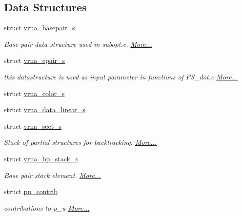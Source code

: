 \subsection*{Data Structures}
\begin{DoxyCompactItemize}
\item 
struct \mbox{\hyperlink{group__data__structures_structvrna__basepair__s}{vrna\+\_\+basepair\+\_\+s}}
\begin{DoxyCompactList}\small\item\em Base pair data structure used in subopt.\+c.  \mbox{\hyperlink{group__data__structures_structvrna__basepair__s}{More...}}\end{DoxyCompactList}\item 
struct \mbox{\hyperlink{group__data__structures_structvrna__cpair__s}{vrna\+\_\+cpair\+\_\+s}}
\begin{DoxyCompactList}\small\item\em this datastructure is used as input parameter in functions of P\+S\+\_\+dot.\+c  \mbox{\hyperlink{group__data__structures_structvrna__cpair__s}{More...}}\end{DoxyCompactList}\item 
struct \mbox{\hyperlink{group__data__structures_structvrna__color__s}{vrna\+\_\+color\+\_\+s}}
\item 
struct \mbox{\hyperlink{group__data__structures_structvrna__data__linear__s}{vrna\+\_\+data\+\_\+linear\+\_\+s}}
\item 
struct \mbox{\hyperlink{group__data__structures_structvrna__sect__s}{vrna\+\_\+sect\+\_\+s}}
\begin{DoxyCompactList}\small\item\em Stack of partial structures for backtracking.  \mbox{\hyperlink{group__data__structures_structvrna__sect__s}{More...}}\end{DoxyCompactList}\item 
struct \mbox{\hyperlink{group__data__structures_structvrna__bp__stack__s}{vrna\+\_\+bp\+\_\+stack\+\_\+s}}
\begin{DoxyCompactList}\small\item\em Base pair stack element.  \mbox{\hyperlink{group__data__structures_structvrna__bp__stack__s}{More...}}\end{DoxyCompactList}\item 
struct \mbox{\hyperlink{group__data__structures_structpu__contrib}{pu\+\_\+contrib}}
\begin{DoxyCompactList}\small\item\em contributions to p\+\_\+u  \mbox{\hyperlink{group__data__structures_structpu__contrib}{More...}}\end{DoxyCompactList}\item 

\end{DoxyCompactItemize}
